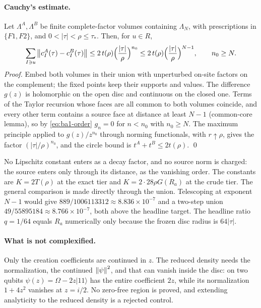 \paragraph{Cauchy's estimate.} Let $\Lambda^A,\Lambda^B$ be finite
complete-factor volumes containing $\Lambda_N$, with prescriptions in
$\{F1,F2\}$, and $0<|\tau|<\rho\le\tau_*$. Then, for $u\in R$,
\begin{equation}
 \sum_{I\ni u}\left\lVert c^A_I(\tau)-c^B_I(\tau)\right\rVert\le2\,t(\rho)
 \Bigl(\frac{|\tau|}{\rho}\Bigr)^{n_0}\le2\,t(\rho)
 \Bigl(\frac{|\tau|}{\rho}\Bigr)^{N-1},\qquad n_0\ge N .
 \label{eq:ba1-schwarz}
\end{equation}
\emph{Proof.} Embed both volumes in their union with unperturbed on-site
factors on the complement; the fixed points keep their supports and values.
The difference $g(z)$ is holomorphic on the open disc and continuous on the
closed one. Terms of the Taylor recursion whose faces are all common to both
volumes coincide, and every other term contains a source face at distance at
least $N-1$ (common-core lemma), so by \eqref{eq:ba1-order} $g_n=0$ for
$n<n_0$ with $n_0\ge N$. The maximum principle applied to $g(z)/z^{n_0}$
through norming functionals, with $r\uparrow\rho$, gives the factor
$(|\tau|/\rho)^{n_0}$, and the circle bound is $t^A+t^B\le2t(\rho)$. \qed

No Lipschitz constant enters as a decay factor, and no source norm is charged:
the source enters only through its distance, as the vanishing order. The
constants are $K=2T(\rho)$ at the exact tier and $K=2\cdot28\rho G(R_a)$ at the
crude tier. The general comparison is made directly through the union.
Telescoping at exponent $N-1$ would give $889/1006113312\approx8.836\times
10^{-7}$ and a two-step union $49/55895184\approx8.766\times10^{-7}$, both
above the headline target. The headline ratio $q=1/64$ equals $R_a$
numerically only because the frozen disc radius is $64|\tau|$.

\paragraph{What is not complexified.} Only the creation coefficients are
continued in $z$. The reduced density needs the normalization, the continued
$\left\lVert\psi\right\rVert^2$, and that can vanish inside the disc: on two qubits
$\psi(z)=\Omega-2z|11\rangle$ has the entire coefficient $2z$, while its
normalization $1+4z^2$ vanishes at $z=i/2$. No zero-free region is proved, and
extending analyticity to the reduced density is a rejected control.

